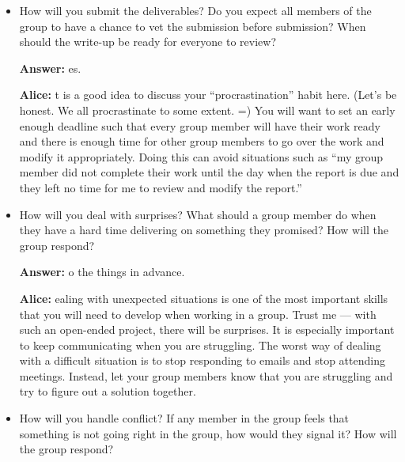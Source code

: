 \documentclass[12pt]{article}
\newenvironment{answer}[1]{
\color{blue}
	{\bf Answer:}
}{
}
\newenvironment{alice}[1]{
\color{magenta}
	{\bf Alice:}
}{
}
\begin{document}
\begin{itemize}
\begin{alice}
It's fine to use a divide-and-conquer approach.  However, you should make sure to assign a similar amount of work to each group member such that no one feels overwhelmed or left out.  
\end{alice}

\item How will you submit the deliverables? Do you expect all members of the group to have a chance to vet the submission before submission? When should the write-up be ready for everyone to review?

\begin{answer}

Yes.
\end{answer}

\begin{alice}

It is a good idea to discuss your ``procrastination'' habit here.  (Let's be honest.  We all procrastinate to some extent. =)  You will want to set an early enough deadline such that every group member will have their work ready and there is enough time for other group members to go over the work and modify it appropriately.  Doing this can avoid situations such as ``my group member did not complete their work until the day when the report is due and they left no time for me to review and modify the report.''
\end{alice}

\item How will you deal with surprises? What should a group member do when they have a hard time delivering on something they promised? How will the group respond?

\begin{answer}

Do the things in advance.
\end{answer}

\begin{alice}

Dealing with unexpected situations is one of the most important skills that you will need to develop when working in a group.  Trust me --- with such an open-ended project, there will be surprises.  It is especially important to keep communicating when you are struggling.  The worst way of dealing with a difficult situation is to stop responding to emails and stop attending meetings.  Instead, let your group members know that you are struggling and try to figure out a solution together.
\end{alice}

\item How will you handle conflict? If any member in the group feels that something is not going right in the group, how would they signal it? How will the group respond?


\end{itemize}
\end{document}
